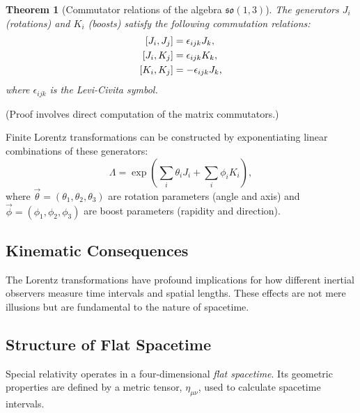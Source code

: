 \documentclass{amsart}
\newtheorem{theorem}{Theorem}[section]
\theoremstyle{definition}
\theoremstyle{remark}
\begin{document}
\begin{theorem}[Commutator relations of the algebra $\mathfrak{so}(1,3)$]\label{thm:so13_algebra_commutation_relations}
  The generators $J_i$ (rotations) and $K_i$ (boosts) satisfy the following commutation relations:
  \begin{align*}
    \relax [J_i, J_j] &= \epsilon_{ijk} J_k, \\
    \relax [J_i, K_j] &= \epsilon_{ijk} K_k, \\
    \relax [K_i, K_j] &= -\epsilon_{ijk} J_k,
  \end{align*}
  where $\epsilon_{ijk}$ is the Levi-Civita symbol.
\end{theorem}
(Proof involves direct computation of the matrix commutators.)

Finite Lorentz transformations can be constructed by exponentiating linear combinations of these generators:
\begin{equation*}
  \Lambda = \exp\left(\sum_i \theta_i J_i + \sum_i \phi_i K_i \right),
\end{equation*}
where $\vec{\theta} = (\theta_1, \theta_2, \theta_3)$ are rotation parameters (angle and axis) and $\vec{\phi} = (\phi_1, \phi_2, \phi_3)$ are boost parameters (rapidity and direction).

\subsection{Kinematic Consequences}
\label{subsec:sr_kinematics}
The Lorentz transformations have profound implications for how different inertial observers measure time intervals and spatial lengths. These effects are not mere illusions but are fundamental to the nature of spacetime.

\subsection{Structure of Flat Spacetime}
\label{subsec:sr_structure}
Special relativity operates in a four-dimensional \emph{flat spacetime}. Its geometric properties are defined by a metric tensor, $\eta_{\mu\nu}$, used to calculate spacetime intervals.
\end{document}
